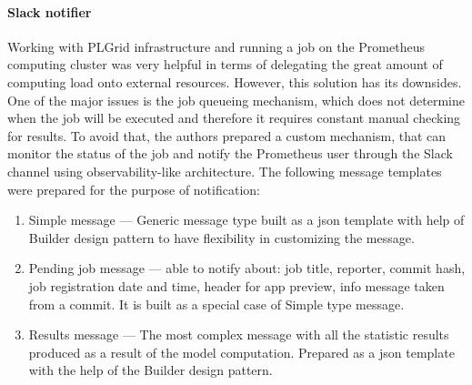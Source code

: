 \paragraph{Slack notifier}\label{para:slack-notifier}
Working with PLGrid infrastructure and running a job on the Prometheus computing cluster was very helpful in terms of delegating the great amount of computing load onto external resources.
However, this solution has its downsides.
One of the major issues is the job queueing mechanism, which does not determine when the job will be executed and therefore it requires constant manual checking for results.
To avoid that, the authors prepared a custom mechanism, that can monitor the status of the job and notify the Prometheus user through the Slack channel using observability-like architecture.
The following message templates were prepared for the purpose of notification:
\begin{enumerate}
    \item Simple message --- Generic message type built as a \gls{json} template with help of Builder design pattern to have flexibility in customizing the message.
    \item Pending job message --- able to notify about: job title, reporter, commit hash, job registration date and time, header for app preview, info message taken from a commit.
    It is built as a special case of Simple type message.
    \item Results message --- The most complex message with all the statistic results produced as a result of the model computation.
    Prepared as a \gls{json} template with the help of the Builder design pattern.
\end{enumerate}
